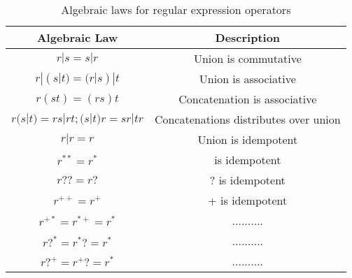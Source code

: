 \begin{table}[t]
\centering
\begin{tabular}{@{}c c@{}}
\toprule
Algebraic Law                      & \quad Description                                    \\ \midrule
\(r|s = s|r\)                      & \quad Union is commutative                           \\
\(r|(s|t) = (r|s)|t\)              & \quad Union is associative                           \\
\(r(st) = (rs)t\)                  & \quad Concatenation is associative                   \\
\(r(s|t) = rs|rt; (s|t)r = sr|tr\) & \quad Concatenations distributes over union          \\ 
\(r|r = r\)      & \quad Union is idempotent \\
\(r^{**} = r^*\)   & \quad * is idempotent \\
\(r?? = r?\)       & \quad ? is idempotent \\
\(r^{++} = r^+\)   & \quad + is idempotent \\

\(r^{+*} = r^{*+} = r^*\)  & \quad .......... \\
\(r?^* = r^*? = r^*\)      & \quad .......... \\
\(r?^+ = r^+? = r^*\)      & \quad .......... \\ \bottomrule
\end{tabular}
\caption{Algebraic laws for regular expression operators}
\label{tab:regex-laws}
\end{table}